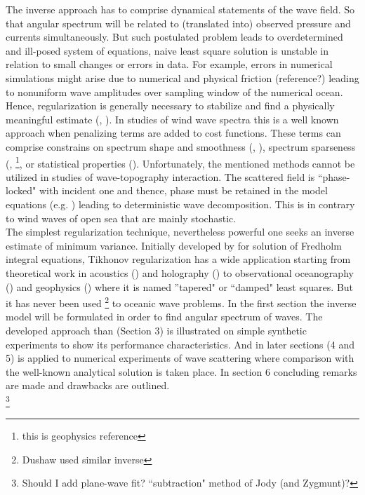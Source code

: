 The inverse approach has to comprise dynamical statements of the wave field. So that angular 
spectrum will be related to (translated into) observed pressure and currents simultaneously. But 
such postulated problem leads to overdetermined and ill-posed system of equations, naive least 
square solution is unstable in relation to small changes or errors in data. For example, errors in 
numerical simulations might arise due to numerical and physical friction (reference?) leading to 
nonuniform wave amplitudes over sampling window of the numerical ocean. Hence, regularization is 
generally necessary to stabilize and find a physically meaningful estimate (\cite{munk2009ocean}, 
\cite{snieder1999inverse}). In studies of wind wave spectra this is a well 
known approach when penalizing terms are added to cost functions. These terms can comprise 
constrains on spectrum shape and smoothness (\cite{long1979variational}, 
\cite{herbers1990estimation}), spectrum sparseness (\cite{hashimoto1989directional}, 
\cite{sacchi1996estimation}\footnote{this is geophysics reference}, or statistical properties 
(\cite{benoit1997analysing}). Unfortunately, the mentioned methods cannot be utilized in studies of 
wave-topography interaction. The scattered field is ``phase-locked" with incident one and thence, 
phase must be retained in the model equations (e.g. \cite{thomson2005reflection}) leading to 
deterministic wave decomposition. This is in contrary to wind waves of open sea that are mainly 
stochastic.\\

The simplest regularization technique, nevertheless powerful one seeks an inverse estimate of minimum variance. Initially developed by \cite{tikhonov2013numerical} for solution of Fredholm integral equations, Tikhonov regularization has a wide application starting from theoretical work in acoustics (\cite{colton1996simple}) and holography (\cite{williams2001regularization}) to observational oceanography (\cite{munk2009ocean}) and geophysics (\cite{snieder1999inverse}) where it is named ''tapered" or ``damped" least squares. But it has never been used \footnote{Dushaw used similar inverse} to oceanic wave problems. In the first section the inverse model will be formulated in order to find angular spectrum of waves. The developed approach than (Section 3) is illustrated on simple synthetic experiments to show its performance characteristics. And in later sections (4 and 5) is applied to numerical experiments of wave scattering where comparison with the well-known analytical solution is taken place. In section 6 concluding remarks are made and drawbacks are outlined.\\
\footnote{Should I add plane-wave fit? ``subtraction" method of Jody (and Zygmunt)?}
~\\

